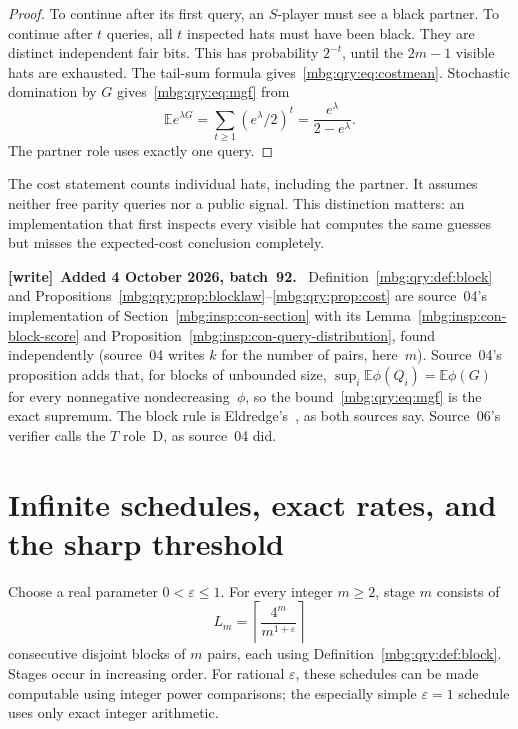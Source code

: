 \documentclass[11pt,letterpaper]{article}
\theoremstyle{definition}
\newcommand{\E}{\mathbb E}
\newenvironment{writenote}[1][]{\par\smallskip\begingroup\small
 \noindent\textbf{[write]}\if\relax\detokenize{#1}\relax\else~\textbf{#1.}\fi\ }%
 {\par\endgroup\smallskip}
\begin{document}
\begin{proof}
To continue after its first query, an \(S\)-player must see a black
partner. To continue after \(t\) queries, all \(t\) inspected hats must
have been black. They are distinct independent fair bits. This has
probability \(2^{-t}\), until the \(2m-1\) visible hats are exhausted.
The tail-sum formula gives~\eqref{mbg:qry:eq:costmean}.
Stochastic domination by \(G\) gives~\eqref{mbg:qry:eq:mgf} from
\[
 \E e^{\lambda G}
 =\sum_{t\ge1}(e^\lambda/2)^t
 =\frac{e^\lambda}{2-e^\lambda}.
\]
The partner role uses exactly one query.
\end{proof}

The cost statement counts individual hats, including the partner.
It assumes neither free parity queries nor a public signal.
This distinction matters: an implementation that first inspects every
visible hat computes the same guesses but misses the expected-cost
conclusion completely.

\begin{writenote}[Added 4 October 2026, batch~92]
Definition~\ref{mbg:qry:def:block} and Propositions~\ref{mbg:qry:prop:blocklaw}--\ref{mbg:qry:prop:cost} are source~04's implementation of Section~\ref{mbg:insp:con-section} with its Lemma~\ref{mbg:insp:con-block-score} and Proposition~\ref{mbg:insp:con-query-distribution}, found independently (source~04 writes $k$ for the number of pairs, here~$m$). Source~04's proposition adds that, for blocks of unbounded size, $\sup_i\E\phi(Q_i)=\E\phi(G)$ for every nonnegative nondecreasing~$\phi$, so the bound~\eqref{mbg:qry:eq:mgf} is the exact supremum. The block rule is Eldredge's~\cite[Proposition~6.6]{hat:Eldredge}, as both sources say. Source~06's verifier calls the $T$ role~D, as source~04 did.
\end{writenote}

\section{Infinite schedules, exact rates, and the sharp threshold}
\label{mbg:qry:sec:schedule}

Choose a real parameter \(0<\varepsilon\le1\). For every integer \(m\ge2\),
stage \(m\) consists of
\begin{equation}
 L_m=\left\lceil\frac{4^m}{m^{1+\varepsilon}}\right\rceil
 \label{mbg:qry:eq:schedule}
\end{equation}
consecutive disjoint blocks of \(m\) pairs, each using
Definition~\ref{mbg:qry:def:block}. Stages occur in increasing order.
For rational \(\varepsilon\), these schedules can be made computable
using integer power comparisons; the especially simple
\(\varepsilon=1\) schedule uses only exact integer arithmetic.
\end{document}
